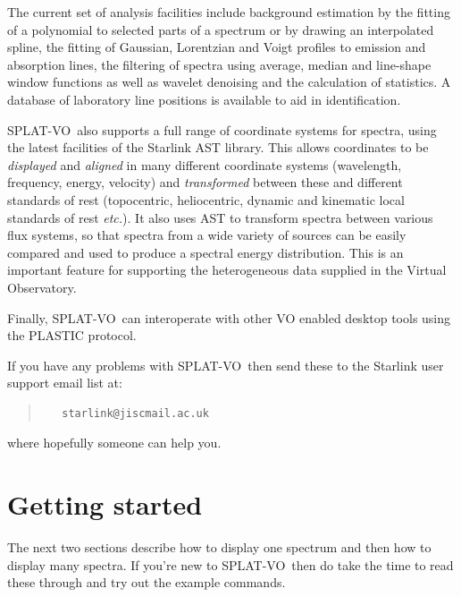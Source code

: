 \documentclass[twoside,11pt]{article}
\newcommand{\xref}[3]{#1}
\newcommand{\xlabel}[1]{}
\renewcommand{\_}{\texttt{\symbol{95}}}
\newcommand{\SPLAT}{\textsf{SPLAT-VO}}
\newcommand{\etc}{\textit{etc.}}
\begin{document}
The current set of analysis facilities include background estimation by the
fitting of a polynomial to selected parts of a spectrum or by drawing an
interpolated spline, the fitting of Gaussian, Lorentzian and Voigt profiles to
emission and absorption lines, the filtering of spectra using average,
median and line-shape window functions as well as wavelet denoising and
the calculation of statistics.
A database of laboratory line positions is available to aid in identification.

\SPLAT\ also supports a full range of coordinate systems for spectra,
using the latest facilities of the Starlink \xref{AST}{sun211}{}
library.
This allows coordinates to be \textit{displayed} and \textit{aligned}
in many different coordinate systems (wavelength, frequency, energy,
velocity) and \textit{transformed} between these and different
standards of rest (topocentric, heliocentric, dynamic and kinematic
local standards of rest \etc).
It also uses AST to transform spectra between various flux systems, so that
spectra from a wide variety of sources can be easily compared and used to
produce a spectral energy distribution.
This is an important feature for supporting the heterogeneous data supplied
in the Virtual Observatory.

Finally, \SPLAT\ can interoperate with other VO enabled desktop tools using
the PLASTIC protocol.


If you have any problems with \SPLAT\, then send these to the Starlink user
support email list at:
\begin{quote}
\begin{verbatim}
   starlink@jiscmail.ac.uk
\end{verbatim}
\end{quote}
where hopefully someone can help you.

\section{Getting started\xlabel{getting_started}}

The next two sections describe how to display one spectrum and then
how to display many spectra. If you're new to \SPLAT\ then do take the
time to read these through and try out the example commands.
\end{document}
